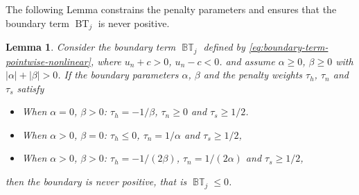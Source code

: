 \documentclass{article}
\numberwithin{equation}{section}
\newtheorem{lemma}{Lemma}
\theoremstyle{definition}
\begin{document}
The following Lemma constrains the penalty parameters and ensures that the boundary term $\operatorname{BT}_j$  is never positive.
\begin{lemma}\label{lem:boundary-term-pointwise-nonlinear}
    Consider the boundary term  $\operatorname{\mathbb{BT}}_j$ defined by \eqref{eq:boundary-term-pointwise-nonlinear}, where $u_n + c >0$, $u_n-c < 0$. and assume $\alpha\ge 0$,  $\beta \ge 0$ with $|\alpha| + |\beta| >0$.
    If the boundary parameters $\alpha$, $\beta$ and the penalty weights $\tau_h$, $\tau_n$ and $\tau_s$ satisfy
    \begin{itemize}
      \item[ 1:]  When $\alpha = 0$, $\beta > 0$:  $\tau_h = -1/\beta$, $\tau_n \ge 0$ and $\tau_s \ge 1/2$.
       \item[2:]  When  $\alpha > 0$, $\beta = 0$:  $\tau_h \le 0$, $\tau_n = 1/\alpha$ and $\tau_s \ge 1/2$,
       \item[3:]  When $\alpha > 0$, $\beta > 0$:  $\tau_h =-1/(2\beta)$, $\tau_n = 1/(2\alpha)$ and $\tau_s \ge 1/2$,
    \end{itemize}
  then the boundary is never positive, that is $\operatorname{\mathbb{BT}}_j \le 0$.
\end{lemma}
\end{document}
